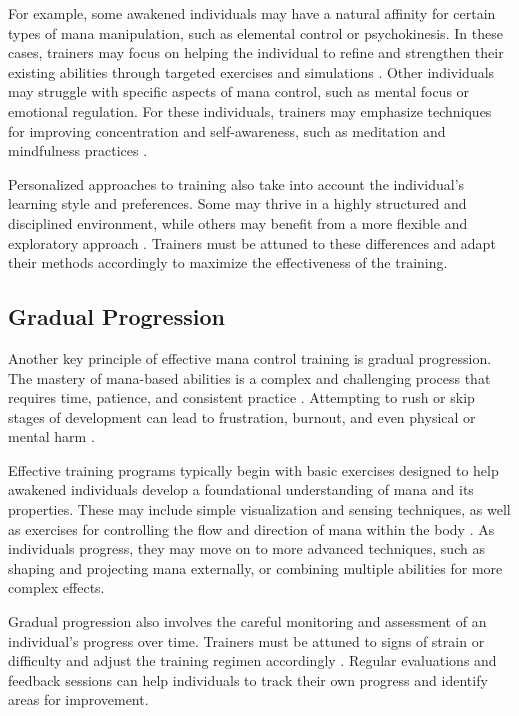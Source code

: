 \documentclass[12pt, a4paper]{article}
\begin{document}
For example, some awakened individuals may have a natural affinity for certain types of mana manipulation, such as elemental control or psychokinesis. In these cases, trainers may focus on helping the individual to refine and strengthen their existing abilities through targeted exercises and simulations \cite{Nakano2027}. Other individuals may struggle with specific aspects of mana control, such as mental focus or emotional regulation. For these individuals, trainers may emphasize techniques for improving concentration and self-awareness, such as meditation and mindfulness practices \cite{Watanabe2027}.

Personalized approaches to training also take into account the individual's learning style and preferences. Some may thrive in a highly structured and disciplined environment, while others may benefit from a more flexible and exploratory approach \cite{Kowalczyk2027}. Trainers must be attuned to these differences and adapt their methods accordingly to maximize the effectiveness of the training.

\subsection{Gradual Progression}
Another key principle of effective mana control training is gradual progression. The mastery of mana-based abilities is a complex and challenging process that requires time, patience, and consistent practice \cite{Lee2027}. Attempting to rush or skip stages of development can lead to frustration, burnout, and even physical or mental harm \cite{Chen2027}.

Effective training programs typically begin with basic exercises designed to help awakened individuals develop a foundational understanding of mana and its properties. These may include simple visualization and sensing techniques, as well as exercises for controlling the flow and direction of mana within the body \cite{Nakamura2027}. As individuals progress, they may move on to more advanced techniques, such as shaping and projecting mana externally, or combining multiple abilities for more complex effects.

Gradual progression also involves the careful monitoring and assessment of an individual's progress over time. Trainers must be attuned to signs of strain or difficulty and adjust the training regimen accordingly \cite{Seo2027}. Regular evaluations and feedback sessions can help individuals to track their own progress and identify areas for improvement.
\end{document}
